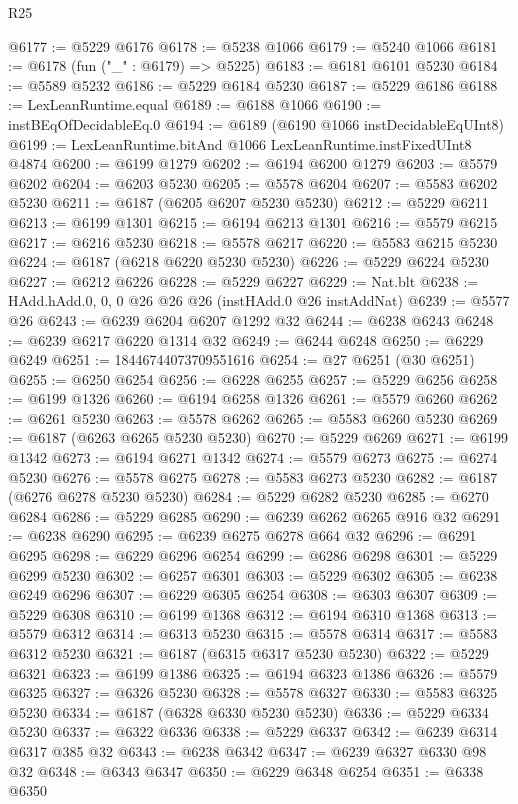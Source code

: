 \begin{lexlean}{R25}
\begin{coremodule}
@6177 := @5229 @6176
@6178 := @5238 @1066
@6179 := @5240 @1066
@6181 := @6178 (fun ("_" : @6179) => @5225)
@6183 := @6181 @6101 @5230
@6184 := @5589 @5232
@6186 := @5229 @6184 @5230
@6187 := @5229 @6186
@6188 := LexLeanRuntime.equal
@6189 := @6188 @1066
@6190 := instBEqOfDecidableEq.{0}
@6194 := @6189 (@6190 @1066 instDecidableEqUInt8)
@6199 := LexLeanRuntime.bitAnd @1066 LexLeanRuntime.instFixedUInt8 @4874
@6200 := @6199 @1279
@6202 := @6194 @6200 @1279
@6203 := @5579 @6202
@6204 := @6203 @5230
@6205 := @5578 @6204
@6207 := @5583 @6202 @5230
@6211 := @6187 (@6205 @6207 @5230 @5230)
@6212 := @5229 @6211
@6213 := @6199 @1301
@6215 := @6194 @6213 @1301
@6216 := @5579 @6215
@6217 := @6216 @5230
@6218 := @5578 @6217
@6220 := @5583 @6215 @5230
@6224 := @6187 (@6218 @6220 @5230 @5230)
@6226 := @5229 @6224 @5230
@6227 := @6212 @6226
@6228 := @5229 @6227
@6229 := Nat.blt
@6238 := HAdd.hAdd.{0, 0, 0} @26 @26 @26 (instHAdd.{0} @26 instAddNat)
@6239 := @5577 @26
@6243 := @6239 @6204 @6207 @1292 @32
@6244 := @6238 @6243
@6248 := @6239 @6217 @6220 @1314 @32
@6249 := @6244 @6248
@6250 := @6229 @6249
@6251 := 18446744073709551616
@6254 := @27 @6251 (@30 @6251)
@6255 := @6250 @6254
@6256 := @6228 @6255
@6257 := @5229 @6256
@6258 := @6199 @1326
@6260 := @6194 @6258 @1326
@6261 := @5579 @6260
@6262 := @6261 @5230
@6263 := @5578 @6262
@6265 := @5583 @6260 @5230
@6269 := @6187 (@6263 @6265 @5230 @5230)
@6270 := @5229 @6269
@6271 := @6199 @1342
@6273 := @6194 @6271 @1342
@6274 := @5579 @6273
@6275 := @6274 @5230
@6276 := @5578 @6275
@6278 := @5583 @6273 @5230
@6282 := @6187 (@6276 @6278 @5230 @5230)
@6284 := @5229 @6282 @5230
@6285 := @6270 @6284
@6286 := @5229 @6285
@6290 := @6239 @6262 @6265 @916 @32
@6291 := @6238 @6290
@6295 := @6239 @6275 @6278 @664 @32
@6296 := @6291 @6295
@6298 := @6229 @6296 @6254
@6299 := @6286 @6298
@6301 := @5229 @6299 @5230
@6302 := @6257 @6301
@6303 := @5229 @6302
@6305 := @6238 @6249 @6296
@6307 := @6229 @6305 @6254
@6308 := @6303 @6307
@6309 := @5229 @6308
@6310 := @6199 @1368
@6312 := @6194 @6310 @1368
@6313 := @5579 @6312
@6314 := @6313 @5230
@6315 := @5578 @6314
@6317 := @5583 @6312 @5230
@6321 := @6187 (@6315 @6317 @5230 @5230)
@6322 := @5229 @6321
@6323 := @6199 @1386
@6325 := @6194 @6323 @1386
@6326 := @5579 @6325
@6327 := @6326 @5230
@6328 := @5578 @6327
@6330 := @5583 @6325 @5230
@6334 := @6187 (@6328 @6330 @5230 @5230)
@6336 := @5229 @6334 @5230
@6337 := @6322 @6336
@6338 := @5229 @6337
@6342 := @6239 @6314 @6317 @385 @32
@6343 := @6238 @6342
@6347 := @6239 @6327 @6330 @98 @32
@6348 := @6343 @6347
@6350 := @6229 @6348 @6254
@6351 := @6338 @6350

\end{coremodule}
\end{lexlean}
